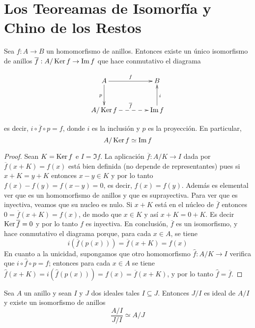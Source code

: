 \section{Los Teoreamas de Isomorfía y Chino de los Restos}

\begin{teo}
    Sea $f:A\rightarrow B$ un homomorfismo de anillos. Entonces existe un único isomorfismo de anillos $\overline{f}: A/\operatorname{\rm Ker} f\rightarrow \operatorname{\rm Im} f$ que hace conmutativo el diagrama

    $$\xymatrix@C=1.5cm@R=1cm{ 
        A \ar[r]^f\ar[d]_p                     & B \\ 
        A/\Ker f \ar@{-->}[r]^{\overline{f}}  & \Im f\ar[u]_i 
    }$$
    
    es decir, $i\circ \overline{f} \circ p=f$, donde $i$ es la inclusión y $p$ es la proyección. En particular,
    $$ A/\operatorname{\rm Ker} f\simeq \operatorname{\rm Im} f$$
\end{teo}

\begin{proof}
    Sean $K=\operatorname{\rm Ker} f$ e $I=\Im f$. La aplicación $\overline{f}: A/K\rightarrow I$ dada por $\overline{f}(x+K)=f(x)$ está bien definida (no depende de representantes) pues si $x+K=y+K$ entonces $x-y\in K$ y por lo tanto $f(x)-f(y)=f(x-y)=0$, es decir, $f(x)=f(y)$. Además es elemental ver que es un homomorfismo de anillos y que es suprayectiva. Para ver que es inyectiva, veamos que su nucleo es nulo. Si $x+K$ está en el núcleo de $\overline{f}$ entonces $0=\overline{f}(x+K)=f(x)$, de modo que $x\in K$ y así $x+K=0+K$. Es decir $\operatorname{\rm Ker}\overline{f}=0$ y por lo tanto $f$ es inyectiva. En conclusión, $\overline{f}$ es un isomorfismo, y hace conmutativo el diagrama porque, para cada $x\in A$, se tiene
    $$i\left(\overline{f}\left(p(x)\right)\right)=\overline{f}(x+K)=f(x)$$
    En cuanto a la unicidad, supongamos que otro homomorfismo $\widehat{f}:A/K\longrightarrow I$ verifica que $i\circ \widehat{f} \circ p=f$; entonces para cada $x\in A$ se tiene $\widehat{f}(x+K)=i(\widehat{f}(p(x)))=f(x)=\overline{f}(x+K)$, y por lo tanto $\widehat{f}=\overline{f}$.
\end{proof}

\begin{teo} Sea $A$ un anillo y sean $I$ y $J$ dos ideales tales $I\subseteq J$.
    Entonces $J/I$ es ideal de $A/I$ y existe un isomorfismo de anillos
    $$\frac{A/I}{J/I}\simeq A/J$$
\end{teo}


